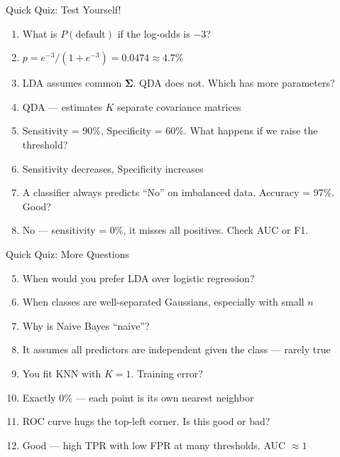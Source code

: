 \documentclass[aspectratio=169, 11pt]{beamer}
\begin{document}
\begin{frame}{Quick Quiz: Test Yourself!}
\begin{enumerate}
  \item What is $P(\text{default})$ if the log-odds is $-3$?
  \pause
  \item[]{\textcolor{muted}{\footnotesize $p = e^{-3}/(1+e^{-3}) = 0.0474 \approx 4.7\%$}}

  \vspace{0.3em}
  \item LDA assumes common $\boldsymbol{\Sigma}$. QDA does not. Which has more parameters?
  \pause
  \item[]{\textcolor{muted}{\footnotesize QDA --- estimates $K$ separate covariance matrices}}

  \vspace{0.3em}
  \item Sensitivity = 90\%, Specificity = 60\%. What happens if we raise the threshold?
  \pause
  \item[]{\textcolor{muted}{\footnotesize Sensitivity decreases, Specificity increases}}

  \vspace{0.3em}
  \item A classifier always predicts ``No'' on imbalanced data. Accuracy = 97\%. Good?
  \pause
  \item[]{\textcolor{muted}{\footnotesize No --- sensitivity = 0\%, it misses all positives. Check AUC or F1.}}
\end{enumerate}
\end{frame}


\begin{frame}{Quick Quiz: More Questions}
\begin{enumerate}
  \setcounter{enumi}{4}
  \item When would you prefer LDA over logistic regression?
  \pause
  \item[]{\textcolor{muted}{\footnotesize When classes are well-separated Gaussians, especially with small $n$}}

  \vspace{0.3em}
  \item Why is Naive Bayes ``naive''?
  \pause
  \item[]{\textcolor{muted}{\footnotesize It assumes all predictors are independent given the class --- rarely true}}

  \vspace{0.3em}
  \item You fit KNN with $K=1$. Training error?
  \pause
  \item[]{\textcolor{muted}{\footnotesize Exactly 0\% --- each point is its own nearest neighbor}}

  \vspace{0.3em}
  \item ROC curve hugs the top-left corner. Is this good or bad?
  \pause
  \item[]{\textcolor{muted}{\footnotesize Good --- high TPR with low FPR at many thresholds. AUC $\approx 1$}}
\end{enumerate}
\end{frame}
\end{document}
